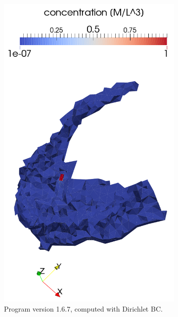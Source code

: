 \begin{figure}[!h]
    \centering
    \begin{subfigure}[b]{0.3\textwidth}
        \centering
        \includegraphics[width=\textwidth]{tests_graphics/mel_long_end_167o.pdf}
        \caption{Program version 1.6.7, computed with Dirichlet BC.}
        \label{fig:bench_mel4a}
    \end{subfigure}
    ~
    \begin{subfigure}[b]{0.3\textwidth}
        \centering

\end{subfigure}
\end{figure}
